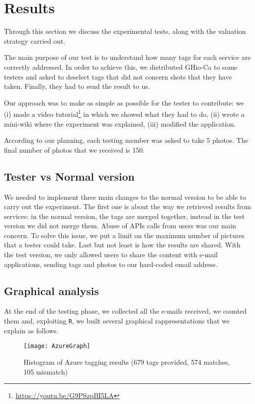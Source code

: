 \section{Results}
\label{sec:results}

Through this section we discuss the experimental tests, along with the valuation 
strategy carried out. 

The main purpose of our test is to understand how many tags for each service are 
correctly addressed. In order to achieve this, we distributed GHio-Ca to some 
testers and asked to deselect tags that did not concern shots that they have 
taken. Finally, they had to send the result to us.

Our approach was to make as simple as possible for the tester to contribute: we 
(i) made a video tutorial\footnote{\url{https://youtu.be/G9PSzpBI5LA}} in which 
we showed what they had to do, (ii) wrote a mini-wiki where the experiment was 
explained, (iii) modified the application. 

According to our planning, each testing member was asked to take 5 photos. 
The final number of photos that we received is 150.

\subsection{Tester vs Normal version}

We needed to implement three main changes to the normal version to be able to 
carry out the experiment. The first one is about the way we retrieved results 
from services: in the normal version, the tags are merged together, instead in 
the test version we did not merge them.
Abuse of APIs calls from users was our main concern. To solve this issue, we put 
a limit on the maximum number of pictures that a tester could take.
Last but not least is how the results are shared. With the test version, we only 
allowed users to share the content with e-mail applications, sending tags and 
photos to our hard-coded email address.


\subsection{Graphical analysis}

At the end of the testing phase, we collected all the e-mails received, we 
counted them and, exploiting \texttt{R}, we built several graphical 
rappresentations that we explain as follows.

\begin{figure}[H]
\centering
\texttt{[image: AzureGraph]}
\caption{Histogram of Azure tagging results (679 tags provided, 574 matches, 105 
mismatch)}
\label{img:testgraphsazure}
\end{figure}

